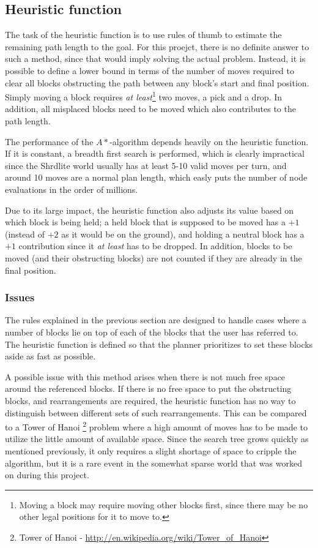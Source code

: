 \subsection{Heuristic function}

The task of the heuristic function is to use rules of thumb to estimate the
remaining path length to the goal. For this proejct, there is no definite answer
to such a method, since that would imply solving the actual problem. Instead, it
is possible to define a lower bound in terms of the number of moves required to
clear all blocks obstructing the path between any block's start and final
position. Simply moving a block requires \textit{at least}\footnote{Moving a
block may require moving other blocks first, since there may be no other legal
positions for it to move to.} two moves, a pick and a drop. In
addition, all misplaced blocks need to be moved which also contributes to the
path length.  

The performance of the $A*$-algorithm depends heavily on the heuristic function.
If it is constant, a breadth first search is performed, which is clearly
impractical since the Shrdlite world usually has at least 5-10 valid moves per
turn, and around 10 moves are a normal plan length, which easly puts the number
of node evaluations in the order of millions. 

Due to its large impact, the heuristic function also adjusts its value based on
which block is being held; a held block that is supposed to be moved has a $+1$
(instead of $+2$ as it would be on the ground), and holding a neutral block has
a $+1$ contribution since it \textit{at least} has to be dropped. In addition,
blocks to be moved (and their obstructing blocks) are not counted if they are
already in the final position.

\subsubsection{Issues}

The rules explained in the previous section are designed to handle cases where a
number of blocks lie on top of each of the blocks that the user has referred
to. The heuristic function is defined so that the planner prioritizes to set
these blocks aside as fast as possible.

A possible issue with this method arises when there is not much free space
around the referenced blocks. If there is no free space to put the obstructing
blocks, and rearrangements are required, the heuristic function has no way to
distinguish between different sets of such rearrangements. This can be compared
to a Tower of Hanoi \footnote{Tower of Hanoi -
\url{http://en.wikipedia.org/wiki/Tower_of_Hanoi}} problem where a high amount of
moves has to be made to utilize the little amount of available space. Since the
search tree grows quickly as mentioned previously, it only requires a slight
shortage of space to cripple the algorithm, but it is a rare event in the
somewhat sparse world that was worked on during this project.

